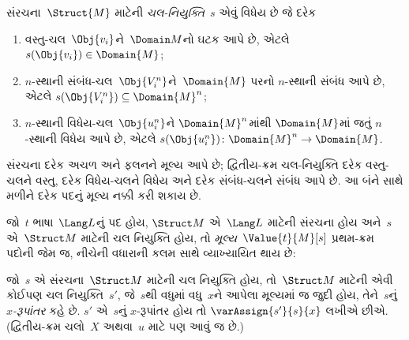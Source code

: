 \begin{defn}[ચલ-નિયુક્તિ]
સંરચના~$\Struct{M}$ માટેની \emph{ચલ-નિયુક્તિ}~$s$ એવું
વિધેય છે જે દરેક
\begin{enumerate}
\item વસ્તુ-ચલ~$\Obj{v_i}$ને~$\Domain M$નો ઘટક આપે છે,
  એટલે $s(\Obj{v_i}) \in \Domain{M}$;
\item $n$-સ્થાની સંબંધ-ચલ~$\Obj{V_i^n}$ને~$\Domain{M}$ પરનો
  $n$-સ્થાની સંબંધ આપે છે, એટલે
  $s(\Obj{V_i^n}) \subseteq \Domain{M}^n$;
\item $n$-સ્થાની વિધેય-ચલ~$\Obj{u_i^n}$ને $\Domain{M}^n$માંથી
  $\Domain{M}$માં જતું $n$-સ્થાની વિધેય આપે છે, એટલે
  $s(\Obj{u_i^n})\colon \Domain{M}^n \to \Domain{M}$.
\end{enumerate}
\end{defn}

\begin{explain}
સંરચના દરેક અચળ અને ફલનને મૂલ્ય
આપે છે; દ્વિતીય-ક્રમ ચલ-નિયુક્તિ દરેક વસ્તુ-ચલને વસ્તુ, દરેક
વિધેય-ચલને વિધેય અને દરેક સંબંધ-ચલને સંબંધ આપે છે. આ બંને સાથે
મળીને દરેક પદનું મૂલ્ય નક્કી કરી શકાય છે.
\end{explain}

\begin{defn}[પદનું મૂલ્ય]
જો~$t$ ભાષા~$\Lang L$નું પદ હોય, $\Struct M$ એ~$\Lang L$ માટેની
સંરચના હોય અને~$s$ એ~$\Struct M$ માટેની ચલ
નિયુક્તિ હોય, તો \emph{મૂલ્ય}~$\Value{t}{M}[s]$ પ્રથમ-ક્રમ
પદોની જેમ જ, નીચેની વધારાની કલમ સાથે વ્યાખ્યાયિત થાય છે:
\begin{quote}
\end{quote}
\end{defn}

\begin{defn}[$x$-રૂપાંતર]
જો~$s$ એ સંરચના~$\Struct M$ માટેની ચલ નિયુક્તિ
હોય, તો~$\Struct M$ માટેની એવી કોઈપણ ચલ નિયુક્તિ~$s'$,
જે~$s$થી વધુમાં વધુ~$x$ને આપેલા મૂલ્યમાં જ જુદી હોય, તેને~$s$નું
\emph{$x$-રૂપાંતર} કહે છે. $s'$ એ~$s$નું $x$-રૂપાંતર હોય તો
$\varAssign{s'}{s}{x}$ લખીએ છીએ. (દ્વિતીય-ક્રમ ચલો~$X$ અથવા~$u$
માટે પણ આવું જ છે.)
\end{defn}

